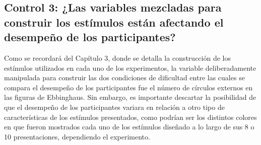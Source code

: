 \subsection{Control 3: ¿Las variables mezcladas para construir los estímulos están afectando el desempeño de los participantes?}

Como se recordará del Capítulo 3, donde se detalla la construcción de los estímulos utilizados en cada uno de los experimentos, la variable deliberadamente manipulada para construir las dos condiciones de dificultad entre las cuales se compara el desempeño de los participantes fue el número de círculos externos en las figuras de Ebbinghaus. Sin embargo, es importante descartar la posibilidad de que el desempeño de los participantes variara en relación a otro tipo de características de los estímulos presentados, como podrían ser los distintos colores en que fueron mostrados cada uno de los estímulos diseñado a lo largo de sus 8 o 10 presentaciones, dependiendo el experimento.\\

